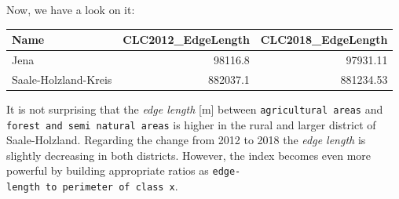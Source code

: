 \documentclass[]{article}
\newenvironment{Shaded}{\begin{snugshade}}{\end{snugshade}}
\newcommand{\KeywordTok}[1]{\textcolor[rgb]{0.13,0.29,0.53}{\textbf{#1}}}
\newcommand{\DataTypeTok}[1]{\textcolor[rgb]{0.13,0.29,0.53}{#1}}
\newcommand{\DecValTok}[1]{\textcolor[rgb]{0.00,0.00,0.81}{#1}}
\newcommand{\StringTok}[1]{\textcolor[rgb]{0.31,0.60,0.02}{#1}}
\newcommand{\CommentTok}[1]{\textcolor[rgb]{0.56,0.35,0.01}{\textit{#1}}}
\newcommand{\OtherTok}[1]{\textcolor[rgb]{0.56,0.35,0.01}{#1}}
\newcommand{\OperatorTok}[1]{\textcolor[rgb]{0.81,0.36,0.00}{\textbf{#1}}}
\newcommand{\NormalTok}[1]{#1}
\begin{document}
\begin{Shaded}
\end{Shaded}

Now, we have a look on it:

\begin{longtable}[]{@{}lrr@{}}
\toprule
Name & CLC2012\_EdgeLength & CLC2018\_EdgeLength\tabularnewline
\midrule
\endhead
Jena & 98116.8 & 97931.11\tabularnewline
Saale-Holzland-Kreis & 882037.1 & 881234.53\tabularnewline
\bottomrule
\end{longtable}

It is not surprising that the \emph{edge length} {[}m{]} between
\texttt{agricultural\ areas} and
\texttt{forest\ and\ semi\ natural\ areas} is higher in the rural and
larger district of Saale-Holzland. Regarding the change from 2012 to
2018 the \emph{edge length} is slightly decreasing in both districts.
However, the index becomes even more powerful by building appropriate
ratios as \texttt{edge-length\ to\ perimeter\ of\ class\ x}.
\end{document}
